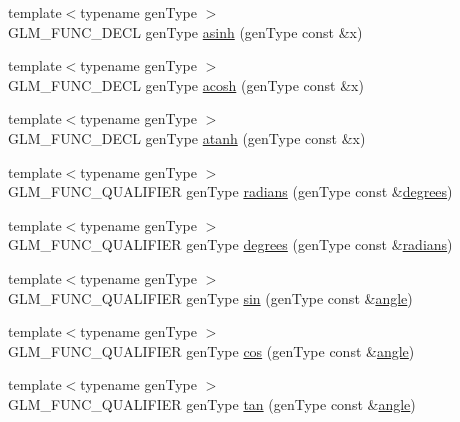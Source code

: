 \begin{DoxyCompactItemize}
\item 
{\footnotesize template$<$typename gen\-Type $>$ }\\G\-L\-M\-\_\-\-F\-U\-N\-C\-\_\-\-D\-E\-C\-L gen\-Type \hyperlink{group__core__func__trigonometric_gaa52acc1218a5ddd0f8d94fcd098685b1}{asinh} (gen\-Type const \&x)
\item 
{\footnotesize template$<$typename gen\-Type $>$ }\\G\-L\-M\-\_\-\-F\-U\-N\-C\-\_\-\-D\-E\-C\-L gen\-Type \hyperlink{group__core__func__trigonometric_ga961d72b4a20d09d6e71fdf076ad4f433}{acosh} (gen\-Type const \&x)
\item 
{\footnotesize template$<$typename gen\-Type $>$ }\\G\-L\-M\-\_\-\-F\-U\-N\-C\-\_\-\-D\-E\-C\-L gen\-Type \hyperlink{group__core__func__trigonometric_gaa20b78cb9c12e30bd5a3054b8cb3d099}{atanh} (gen\-Type const \&x)
\item 
{\footnotesize template$<$typename gen\-Type $>$ }\\G\-L\-M\-\_\-\-F\-U\-N\-C\-\_\-\-Q\-U\-A\-L\-I\-F\-I\-E\-R gen\-Type \hyperlink{group__core__func__trigonometric_ga431d31cdb060059bc5b0696e212f1453}{radians} (gen\-Type const \&\hyperlink{group__core__func__trigonometric_gaf4e5661bd1c993f6090d49e988a4c78a}{degrees})
\item 
{\footnotesize template$<$typename gen\-Type $>$ }\\G\-L\-M\-\_\-\-F\-U\-N\-C\-\_\-\-Q\-U\-A\-L\-I\-F\-I\-E\-R gen\-Type \hyperlink{group__core__func__trigonometric_gaf4e5661bd1c993f6090d49e988a4c78a}{degrees} (gen\-Type const \&\hyperlink{group__core__func__trigonometric_ga431d31cdb060059bc5b0696e212f1453}{radians})
\item 
{\footnotesize template$<$typename gen\-Type $>$ }\\G\-L\-M\-\_\-\-F\-U\-N\-C\-\_\-\-Q\-U\-A\-L\-I\-F\-I\-E\-R gen\-Type \hyperlink{group__core__func__trigonometric_gafbab21016b7f3bc21afb09a7e42e2df1}{sin} (gen\-Type const \&\hyperlink{group__gtc__quaternion_ga23a3fc7ada5bbb665ff84c92c6e0542c}{angle})
\item 
{\footnotesize template$<$typename gen\-Type $>$ }\\G\-L\-M\-\_\-\-F\-U\-N\-C\-\_\-\-Q\-U\-A\-L\-I\-F\-I\-E\-R gen\-Type \hyperlink{group__core__func__trigonometric_gac6708d4f0895dc79b65f50db00840167}{cos} (gen\-Type const \&\hyperlink{group__gtc__quaternion_ga23a3fc7ada5bbb665ff84c92c6e0542c}{angle})
\item 
{\footnotesize template$<$typename gen\-Type $>$ }\\G\-L\-M\-\_\-\-F\-U\-N\-C\-\_\-\-Q\-U\-A\-L\-I\-F\-I\-E\-R gen\-Type \hyperlink{group__core__func__trigonometric_ga328aeb0de4f312dc3d200cb929715d44}{tan} (gen\-Type const \&\hyperlink{group__gtc__quaternion_ga23a3fc7ada5bbb665ff84c92c6e0542c}{angle})

\end{DoxyCompactItemize}
